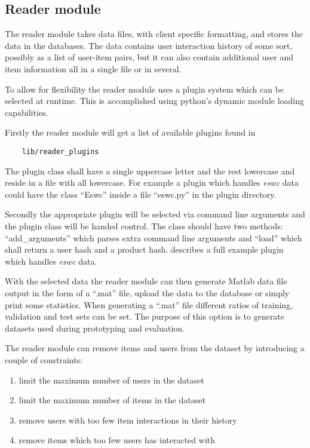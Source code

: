 
\subsection{Reader module}

The reader module takes data files, with client specific formatting, and stores the data in the databases. The data contains user interaction history of some sort, possibly as a list of user-item pairs, but it can also contain additional user and item information all in a single file or in several.

To allow for flexibility the reader module uses a plugin system which can be selected at runtime. This is accomplished using python's dynamic module loading capabilities.

Firstly the reader module will get a list of available plugins found in

\begin{lstlisting}
    lib/reader_plugins
\end{lstlisting}

The plugin class shall have a single uppercase letter and the rest lowercase and reside in a file with all lowercase. For example a plugin which handles \textit{eswc} data could have the class ``Eswc'' inside a file ``eswc.py'' in the plugin directory.

Secondly the appropriate plugin will be selected via command line arguments and the plugin class will be handed control. The class should have two methods: ``add\_arguments'' which parses extra command line arguments and ``load'' which shall return a user hash and a product hash.  describes a full example plugin which handles \textit{eswc} data.

With the selected data the reader module can then generate Matlab data file output in the form of a ``.mat'' file, upload the data to the database or simply print some statistics. When generating a ``.mat'' file different ratios of training, validation and test sets can be set. The purpose of this option is to generate datasets used during prototyping and evaluation.

The reader module can remove items and users from the dataset by introducing a couple of constraints:

\begin{enumerate}
    \item limit the maximum number of users in the dataset
    \item limit the maximum number of items in the dataset
    \item remove users with too few item interactions in their history
    \item remove items which too few users has interacted with
\end{enumerate}

